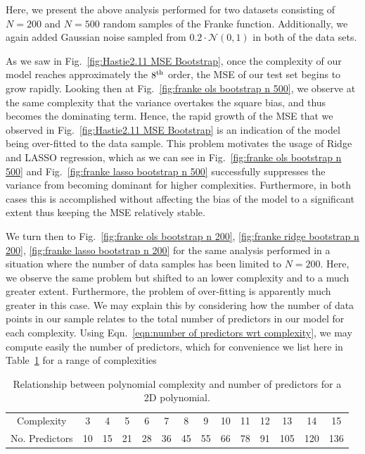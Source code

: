 \documentclass[reprint, english, nofootinbib]{revtex4-2}
\begin{document}
Here, we present the above analysis performed for two datasets consisting of $N=200$ and $N=500$ random samples of the Franke function. Additionally, we again added Gaussian noise sampled from $0.2 \cdot \mathcal N(0,1)$ in both of the data sets.

As we saw in Fig.~\ref{fig:Hastie2.11 MSE Bootstrap}, once the complexity of our model reaches approximately the $8^{\textup{th}}$ order, the MSE of our test set begins to grow rapidly. Looking then at Fig.~\ref{fig:franke ols bootstrap n 500}, we observe at the same complexity that the variance overtakes the square bias, and thus becomes the dominating term. Hence, the rapid growth of the MSE that we observed in Fig.~\ref{fig:Hastie2.11 MSE Bootstrap} is an indication of the model being over-fitted to the data sample.
This problem motivates the usage of Ridge and LASSO regression, which as we can see in Fig.~\ref{fig:franke ols bootstrap n 500} and Fig.~\ref{fig:franke lasso bootstrap n 500} successfully suppresses the variance from becoming dominant for higher complexities. Furthermore, in both cases this is accomplished without affecting the bias of the model to a significant extent thus keeping the MSE relatively stable.

We turn then to Fig.~\ref{fig:franke ols bootstrap n 200}, \ref{fig:franke ridge bootstrap n 200}, \ref{fig:franke lasso bootstrap n 200} for the same analysis performed in a situation where the number of data samples has been limited to $N=200$. Here, we observe the same problem but shifted to an lower complexity and to a much greater extent. Furthermore, the problem of over-fitting is apparently much greater in this case. We may explain this by considering how the number of data points in our sample relates to the total number of predictors in our model for each complexity. Using Eqn.~\ref{eqn:number of predictors wrt complexity}, we may compute easily the number of predictors, which for convenience we list here in Table~\ref{tab: no predictors wrt complexity} for a range of complexities

\begin{table}[h!]
    \caption{\label{tab: no predictors wrt complexity}Relationship between polynomial complexity and number of predictors for a 2D polynomial.}
    \begin{tabular}{|c | c | c | c | c | c | c | c | c | c | c | c | c | c |}
    \hline
     Complexity     & 3  & 4  & 5  & 6  & 7  & 8  & 9  & 10 & 11 & 12 & 13 & 14 & 15 \\
     No. Predictors & 10 & 15 & 21 & 28 & 36 & 45 & 55 & 66 & 78 & 91 & 105 & 120 & 136
     \\ \hline
    \end{tabular}
\end{table}
\end{document}
